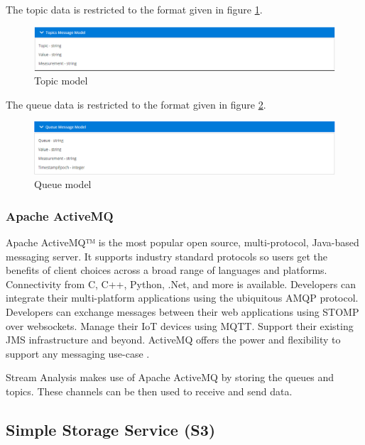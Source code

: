 The topic data is restricted to the format given in figure \ref{fig:topic}.\\

\begin{figure}[h]
	\centering
	\includegraphics[width=1\linewidth]{./images/webapp/topic.PNG}
	\caption{Topic model}
	\label{fig:topic}
\end{figure}

The queue data is restricted to the format given in figure \ref{fig:queue}.\\

\begin{figure}[h]
	\centering
	\includegraphics[width=1\linewidth]{./images/webapp/queue.PNG}
	\caption{Queue model}
	\label{fig:queue}
\end{figure}

\subsubsection{Apache ActiveMQ}
\label{chap:04:03:04:01}

Apache ActiveMQ™ is the most popular open source, multi-protocol, Java-based messaging server. It supports industry standard protocols so users get the benefits of client choices across a broad range of languages and platforms. Connectivity from C, C++, Python, .Net, and more is available. Developers can integrate their multi-platform applications using the ubiquitous AMQP protocol. Developers can exchange messages between their web applications using STOMP over websockets. Manage their IoT devices using MQTT. Support their existing JMS infrastructure and beyond. ActiveMQ offers the power and flexibility to support any messaging use-case \cite{apache-active-mq}.

Stream Analysis makes use of Apache ActiveMQ by storing the queues and topics. These channels can be then used to receive and send data.

\newpage

\subsection{Simple Storage Service (S3)}
\label{chap:04:03:05}

